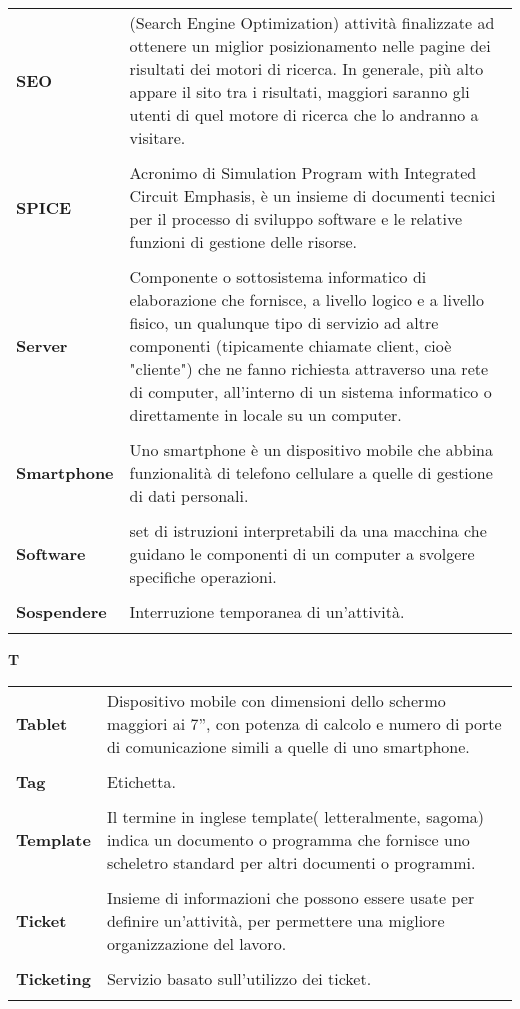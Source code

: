 \begin{longtable}{L{4cm} p{10cm}}
\textbf{SEO} & (Search Engine Optimization) attività finalizzate ad ottenere un miglior posizionamento nelle pagine dei risultati dei motori di ricerca. In generale, più alto appare il sito tra i risultati, maggiori saranno gli utenti di quel motore di ricerca che lo andranno a visitare. \\ 
 \\ 
\textbf{SPICE} & Acronimo di Simulation Program with Integrated Circuit Emphasis, è un insieme di documenti tecnici per il processo di sviluppo software e le relative funzioni di gestione delle risorse. \\ 
 \\ 
\textbf{Server} & Componente o sottosistema informatico di elaborazione che fornisce, a livello logico e a livello fisico, un qualunque tipo di servizio ad altre componenti (tipicamente chiamate client, cioè "cliente") che ne fanno richiesta attraverso una rete di computer, all'interno di un sistema informatico o direttamente in locale su un computer. \\ 
 \\ 
\textbf{Smartphone} & Uno smartphone è un dispositivo mobile che abbina funzionalità di telefono cellulare a quelle di gestione di dati personali. \\ 
 \\ 
\textbf{Software} & set di istruzioni interpretabili da una macchina che guidano le componenti di un computer a svolgere specifiche operazioni. \\ 
 \\ 
\textbf{Sospendere} & Interruzione temporanea di un’attività. \\ 
 \\ 
\end{longtable} 
\newpage 
{} 
{} 
\hfill\Huge{\textbf{T}} \\ 
\normalsize 
\begin{longtable}{L{4cm} p{10cm}}
\textbf{Tablet} & Dispositivo mobile con dimensioni dello schermo maggiori ai 7”, con potenza di calcolo e numero di porte di comunicazione simili a quelle di uno smartphone. \\ 
 \\ 
\textbf{Tag} & Etichetta. \\ 
 \\ 
\textbf{Template} & Il termine in inglese template( letteralmente, sagoma) indica un documento o programma che fornisce uno scheletro standard per altri documenti o programmi. \\ 
 \\ 
\textbf{Ticket} & Insieme di informazioni che possono essere usate per definire un'attività, per permettere una migliore organizzazione del lavoro. \\ 
 \\ 
\textbf{Ticketing} & Servizio basato sull’utilizzo dei ticket. \\ 
 \\ 
\end{longtable} 
